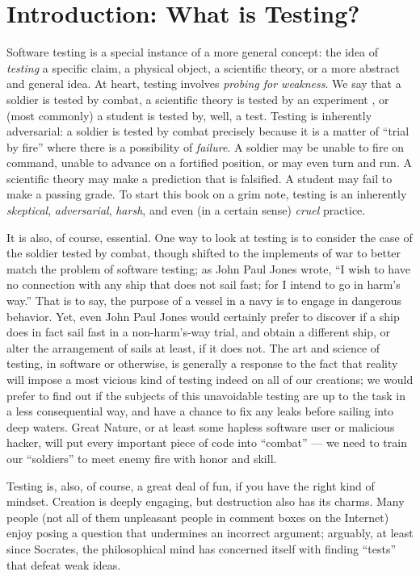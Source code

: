 \chapter{Introduction:  What is Testing?}

Software testing is a special instance of a more general concept:  the
idea of \emph{testing} a specific claim, a physical object, a
scientific theory, or a more abstract and general idea.  At heart,
testing involves \emph{probing for weakness}.  We say that a soldier
is tested by combat, a scientific theory is tested by an experiment \cite{Popper},
or (most commonly) a student is tested by, well, a test.  Testing is
inherently adversarial:  a soldier is tested by combat precisely
because it is a matter of ``trial by fire'' where there is a
possibility of \emph{failure}.  A soldier may be unable to fire on
command, unable to advance on a fortified position, or may even turn
and run.  A scientific theory may make a prediction that is
falsified.  A student may fail to make a passing grade.
To start this book on a grim note,
testing is an inherently \emph{skeptical}, \emph{adversarial},
\emph{harsh}, and even
(in a certain sense) \emph{cruel} practice.

It is also, of course, essential.  One way to look at testing is to
consider the case of the soldier tested by combat, though shifted to
the implements of war to better match the problem of software testing; as John Paul Jones
wrote, ``I wish to have no connection with any ship that does not sail
fast; for I intend to go in harm's way.''  That is to say, the purpose
of a vessel in a navy is to engage in dangerous behavior.  Yet, even John
Paul Jones would certainly prefer to discover if a ship does in fact
sail fast in a non-harm's-way trial, and obtain a different ship, or
alter the arrangement of sails at least, if it does not.  The art and science of testing,
in software or otherwise, is generally a response to the fact that
reality will impose a most vicious kind of testing indeed on all of our creations; we
would prefer to find out if the subjects of this unavoidable testing
are up to the task in a less consequential way, and have a chance to
fix any leaks before sailing into deep waters.  Great Nature, or at
least some hapless software user or malicious hacker, will put every important
piece of code into ``combat'' --- we need to train our ``soldiers'' to meet
enemy fire with honor and skill.

Testing is, also, of course, a great deal of fun, if you have the
right kind of mindset.  Creation is deeply engaging, but destruction
also has its charms.  Many people (not all of them unpleasant people
in comment boxes on the Internet) enjoy posing a question that
undermines an incorrect argument; arguably, at least since Socrates,
the philosophical mind has concerned itself with finding ``tests''
that defeat weak ideas.  

